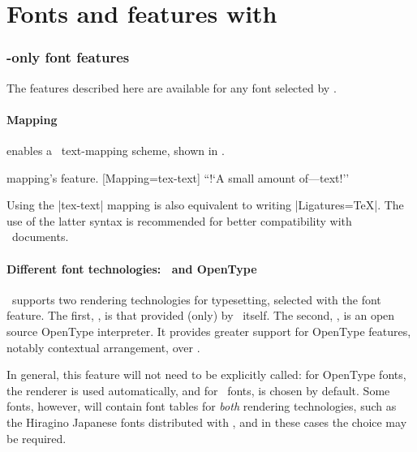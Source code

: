 

\part{Fonts and features with \XeTeX}
\label{sec:xetex-features}

\section{\XeTeX-only font features}

The features described here are available for any font
selected by .

\subsection{Mapping}
\label{sec:mapping}

 enables a \XeTeX\ text-mapping scheme, shown in .

\begin{Xexample}{mapping}{\XeTeX's  feature.}
  [Mapping=tex-text]
  ``!`A small amount of---text!''
\end{Xexample}

Using the |tex-text| mapping is also equivalent to writing |Ligatures=TeX|.
The use of the latter syntax is recommended for better compatibility with
\LuaTeX\ documents.


\subsection{Different font technologies: \AAT\ and OpenType}\label{sec:renderer}

\XeTeX\ supports two rendering technologies for typesetting, selected with
the  font feature. The first, , is
that provided (only) by \MacOSX\ itself. The second, ,
is an open source OpenType interpreter.
It provides greater support for
OpenType features, notably contextual arrangement, over .

In general, this feature will not need to be explicitly called: for OpenType
fonts, the  renderer is used automatically, and for \AAT\ fonts,
 is chosen by default. Some fonts, however, will contain font tables
for \emph{both} rendering technologies, such as the Hiragino Japanese fonts
distributed with \MacOSX, and in these cases the choice may be required.

